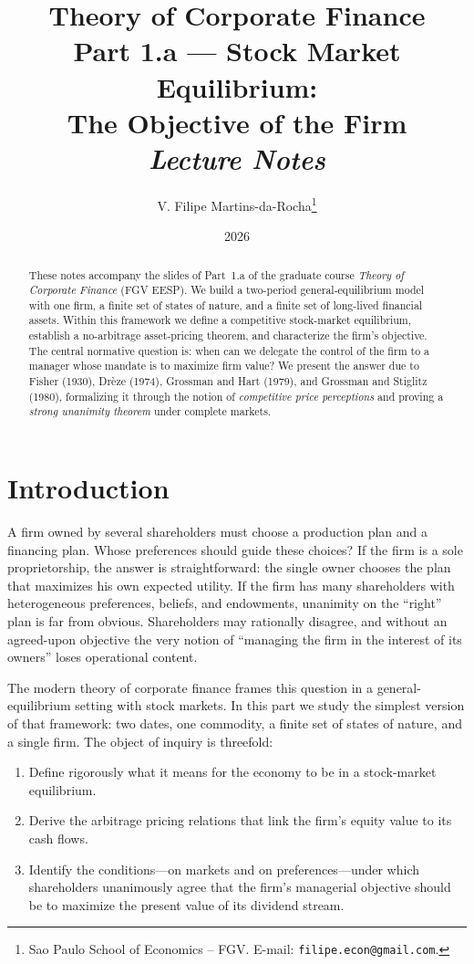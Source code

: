 \documentclass[11pt,a4paper]{article}
\title{Theory of Corporate Finance \\[2pt]
\large Part 1.a --- Stock Market Equilibrium: \\ The Objective of the Firm \\[3pt]
\normalsize\emph{Lecture Notes}}
\author{V. Filipe Martins-da-Rocha\thanks{Sao Paulo School of Economics -- FGV. E-mail: \texttt{filipe.econ@gmail.com}.}}
\date{2026}
\theoremstyle{plain}
\theoremstyle{definition}
\theoremstyle{remark}
\begin{document}
\maketitle

\begin{abstract}
\noindent These notes accompany the slides of Part~1.a of the graduate course \emph{Theory of Corporate Finance} (FGV EESP). We build a two-period general-equilibrium model with one firm, a finite set of states of nature, and a finite set of long-lived financial assets. Within this framework we define a competitive stock-market equilibrium, establish a no-arbitrage asset-pricing theorem, and characterize the firm's objective. The central normative question is: when can we delegate the control of the firm to a manager whose mandate is to maximize firm value? We present the answer due to Fisher (1930), Drèze (1974), Grossman and Hart (1979), and Grossman and Stiglitz (1980), formalizing it through the notion of \emph{competitive price perceptions} and proving a \emph{strong unanimity theorem} under complete markets.
\end{abstract}

\tableofcontents

\section{Introduction}

A firm owned by several shareholders must choose a production plan and a financing plan. Whose preferences should guide these choices? If the firm is a sole proprietorship, the answer is straightforward: the single owner chooses the plan that maximizes his own expected utility. If the firm has many shareholders with heterogeneous preferences, beliefs, and endowments, unanimity on the ``right'' plan is far from obvious. Shareholders may rationally disagree, and without an agreed-upon objective the very notion of ``managing the firm in the interest of its owners'' loses operational content.

The modern theory of corporate finance frames this question in a general-equilibrium setting with stock markets. In this part we study the simplest version of that framework: two dates, one commodity, a finite set of states of nature, and a single firm. The object of inquiry is threefold:

\begin{enumerate}
  \item Define rigorously what it means for the economy to be in a stock-market equilibrium.
  \item Derive the arbitrage pricing relations that link the firm's equity value to its cash flows.
  \item Identify the conditions---on markets and on preferences---under which shareholders unanimously agree that the firm's managerial objective should be to maximize the present value of its dividend stream.
\end{enumerate}
\end{document}
